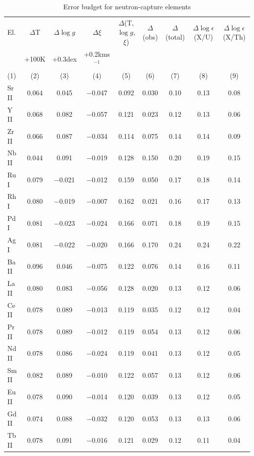 \documentclass{aa}
\begin{document}
\begin{table}
\begin{center}
\caption{Error budget for neutron-capture elements
\label{T-error} }
\begin{tabular}{lcccccccc}
\hline
El. & $\Delta$T &  $\Delta\log g$ &  $\Delta \xi$ & $\Delta$(T,$\log g$,$\xi$) 
& $\Delta$(obs) & $\Delta$(total) 
& $\Delta \log \epsilon$(X/U) & $\Delta \log \epsilon$(X/Th) \\
      & +100K & +0.3dex       & +0.2kms$^{-1}$ \\
(1) & (2) & (3) & (4) & (5) & (6) &(7) & (8) & (9) \\ 
\hline
Sr II & 0.064 & 0.045 & $-$0.047 & 0.092 & 0.030 & 0.10 & 0.13 &  0.08 \\ 
 Y II & 0.068 & 0.082 & $-$0.057 & 0.121 & 0.023 & 0.12 & 0.13 &  0.06 \\ 
Zr II & 0.066 & 0.087 & $-$0.034 & 0.114 & 0.075 & 0.14 & 0.14 &  0.09 \\ 
Nb II & 0.044 & 0.091 & $-$0.019 & 0.128 & 0.150 & 0.20 & 0.19 &  0.15 \\
Ru I  & 0.079 &$-$0.021 &$-$0.012 & 0.159 & 0.050 & 0.17 & 0.18 &  0.14 \\
Rh I  & 0.080 &$-$0.019 &$-$0.007 & 0.162 & 0.021 & 0.16 & 0.17 &  0.13 \\
Pd I  & 0.081 &$-$0.023 &$-$0.024 & 0.166 & 0.071 & 0.18 & 0.19 &  0.15 \\
Ag I  & 0.081 &$-$0.022 &$-$0.020 & 0.166 & 0.170& 0.24 & 0.24 &  0.22 \\
Ba II & 0.096 & 0.046 & $-$0.075 & 0.122 & 0.076 & 0.14 & 0.16 &  0.11 \\ 
La II & 0.080 & 0.083 & $-$0.056 & 0.128 & 0.020 & 0.13 & 0.12 &  0.06 \\ 
Ce II & 0.078 & 0.089 & $-$0.013 & 0.119 & 0.035 & 0.12 & 0.12 &  0.04 \\ 
Pr II & 0.078 & 0.089 & $-$0.012 & 0.119 & 0.054 & 0.13 & 0.12 &  0.06 \\ 
Nd II & 0.078 & 0.086 & $-$0.024 & 0.119 & 0.041 & 0.13 & 0.12 &  0.05 \\     
Sm II & 0.082 & 0.089 & $-$0.010 & 0.122 & 0.057 & 0.13 & 0.12 &  0.06 \\ 
Eu II & 0.078 & 0.090 & $-$0.014 & 0.120 & 0.039 & 0.13 & 0.12 &  0.05\\
Gd II & 0.074 & 0.088 & $-$0.032 & 0.120 & 0.053 & 0.13 & 0.13 &  0.06 \\ 
Tb II & 0.078 & 0.091 & $-$0.016 & 0.121 & 0.029 & 0.12 & 0.11 &  0.04 \\

\end{tabular}
\end{center}
\end{table}
\end{document}
